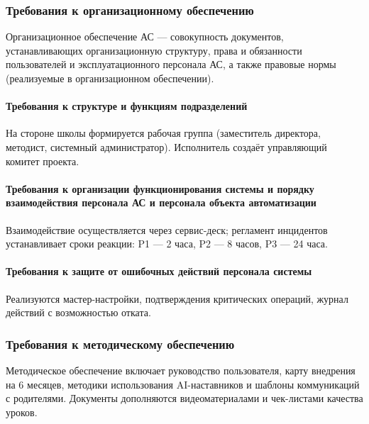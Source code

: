 \documentclass[14pt,a4paper]{extarticle}
\begin{document}
\subsubsection{Требования к организационному обеспечению}
Организационное обеспечение АС — совокупность документов, устанавливающих организационную структуру, права и обязанности пользователей и эксплуатационного персонала АС, а также правовые нормы (реализуемые в организационном обеспечении).
\paragraph{Требования к структуре и функциям подразделений} На стороне школы формируется рабочая группа (заместитель директора, методист, системный администратор). Исполнитель создаёт управляющий комитет проекта.
\paragraph{Требования к организации функционирования системы и порядку взаимодействия персонала АС и персонала объекта автоматизации} Взаимодействие осуществляется через сервис-деск; регламент инцидентов устанавливает сроки реакции: P1 — 2 часа, P2 — 8 часов, P3 — 24 часа.
\paragraph{Требования к защите от ошибочных действий персонала системы} Реализуются мастер-настройки, подтверждения критических операций, журнал действий с возможностью отката.

\subsubsection{Требования к методическому обеспечению}
Методическое обеспечение включает руководство пользователя, карту внедрения на 6 месяцев, методики использования AI-наставников и шаблоны коммуникаций с родителями. Документы дополняются видеоматериалами и чек-листами качества уроков.

\end{document}
